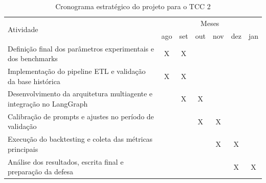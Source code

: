 \documentclass{eic-bcc-tcc}
\begin{document}
\begin{table}[!ht]
\centering
\caption{Cronograma estratégico do projeto para o TCC 2}
\label{tab:cronograma_detalhado}
\scriptsize{
\begin{tabular}{l c c c c c c}
\toprule
\multirow{2}{*}{Atividade} & \multicolumn{6}{c}{Meses} \\
& ago & set & out & nov & dez & jan \\
\midrule
Definição final dos parâmetros experimentais e dos benchmarks & X & X & & & & \\
Implementação do pipeline ETL e validação da base histórica & X & X & & & & \\
Desenvolvimento da arquitetura multiagente e integração no LangGraph & & X & X & & & \\
Calibração de prompts e ajustes no período de validação & & & X & X & & \\
Execução do backtesting e coleta das métricas principais & & & & X & X & \\
Análise dos resultados, escrita final e preparação da defesa & & & & & X & X \\
\bottomrule
\end{tabular}
}
\end{table}

\backmatter

\end{document}
